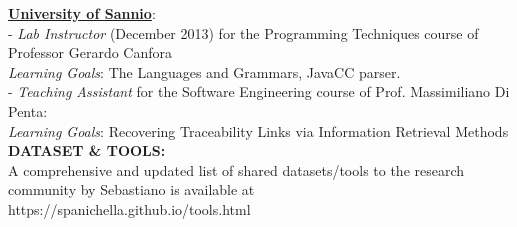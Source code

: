 \documentclass[12pt]{article}
\begin{document}
\href{http://www.unisa.it}{\textbf{University of Sannio}}:\\
- \textit{Lab Instructor} (December 2013) for the Programming Techniques course of Professor Gerardo Canfora\\   \textit{Learning Goals}:   The Languages ​​and Grammars, JavaCC parser.\\
- \textit{Teaching Assistant } for the Software Engineering course of Prof. Massimiliano Di Penta:\\   \textit{Learning Goals}:   
Recovering Traceability Links via Information Retrieval Methods\\



\textbf{DATASET \& TOOLS:}\\
A comprehensive and updated list of shared datasets/tools to the research community by Sebastiano is available at\\ https://spanichella.github.io/tools.html\\
\end{document}
